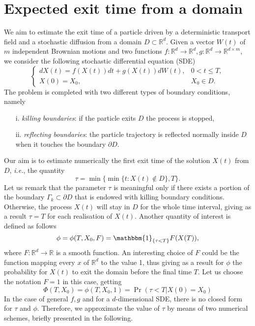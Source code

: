 \section{Expected exit time from a domain}
We aim to estimate the exit time of a particle driven by a deterministic transport field and a stochastic diffusion from a domain $D \subset \mathbb{R}^d$. Given a vector $W(t)$ of $m$ independent Brownian motions and two functions $f\colon \mathbb{R}^d \rightarrow \mathbb{R}^d, g \colon \mathbb{R}^d \rightarrow \mathbb{R}^{d\times m}$, we consider the following stochastic differential equation (SDE)
\begin{equation}\label{eq:GeneralModel}
\begin{cases}
	dX(t) = f(X(t)) dt + g(X(t))dW(t), & 0 < t \leq T, \\
	X(0)  = X_0, & X_0 \in D.
\end{cases}
\end{equation}
The problem is completed with two different types of boundary conditions, namely
\begin{itemize}
	\item[i.]  \textit{killing boundaries}: if the particle exits $D$ the process is stopped,
	\item[ii.] \textit{reflecting boundaries}: the particle trajectory is reflected normally inside $D$ when it touches the boundary $\partial D$.
\end{itemize}
Our aim is to estimate numerically the first exit time of the solution $X(t)$ from $D$, \textit{i.e.}, the quantity
\begin{equation}\label{eq:GeneralTau}
	\tau = \min\{\min\{t\colon X(t)\notin D\},T\}.
\end{equation}
Let us remark that the parameter $\tau$ is meaningful only if there exists a portion of the boundary $\Gamma_k \subset \partial D$ that is endowed with killing boundary conditions. Otherwise, the process $X(t)$ will stay in $D$ for the whole time interval, giving as a result $\tau = T$ for each realisation of $X(t)$. Another quantity of interest is defined as follows
\begin{equation}\label{eq:GeneralPhi}
	\phi = \phi(T,X_0,F) = \mathbbm{1}_{\{\tau<T\}}F(X(T)),
\end{equation}
where $F\colon \mathbb{R}^d \rightarrow \mathbb{R}$ is a smooth function. An interesting choice of $F$ could be the function mapping every $x$ of $\mathbb{R}^d$ to the value 1, thus giving as a result for $\phi$ the probability for $X(t)$ to exit the domain before the final time $T$. Let us choose the notation $F = 1$ in this case, getting
\begin{equation}\label{eq:ExitProb}
	\Phi(T,X_0) = \phi(T,X_0,1) = \Pr(\tau < T | X(0) = X_0)
\end{equation}
In the case of general $f,g$ and for a $d$-dimensional SDE, there is no closed form for $\tau$ and $\phi$. Therefore, we approximate the value of $\tau$ by means of two numerical schemes, briefly presented in the following.





